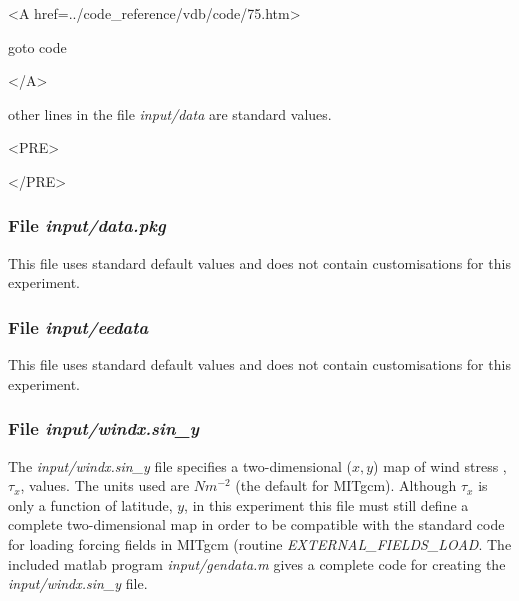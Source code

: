 \begin{itemize}
{\bf
\begin{rawhtml} <A href=../code_reference/vdb/code/75.htm> \end{rawhtml}
goto code
\begin{rawhtml} </A>\end{rawhtml}
}

\end{itemize}

\noindent other lines in the file {\it input/data} are standard values.

\begin{rawhtml}<PRE>\end{rawhtml}
\begin{small}

\end{small}
\begin{rawhtml}</PRE>\end{rawhtml}

\subsubsection{File {\it input/data.pkg}}
\label{www:tutorials}

This file uses standard default values and does not contain
customisations for this experiment.

\subsubsection{File {\it input/eedata}}
\label{www:tutorials}

This file uses standard default values and does not contain
customisations for this experiment.

\subsubsection{File {\it input/windx.sin\_y}}
\label{www:tutorials}

The {\it input/windx.sin\_y} file specifies a two-dimensional ($x,y$) 
map of wind stress ,$\tau_{x}$, values. The units used are $Nm^{-2}$ (the
default for MITgcm).
Although $\tau_{x}$ is only a function of latitude, $y$,
in this experiment
this file must still define a complete two-dimensional map in order
to be compatible with the standard code for loading forcing fields 
in MITgcm (routine {\it EXTERNAL\_FIELDS\_LOAD}.
The included matlab program {\it input/gendata.m} gives a complete
code for creating the {\it input/windx.sin\_y} file.

